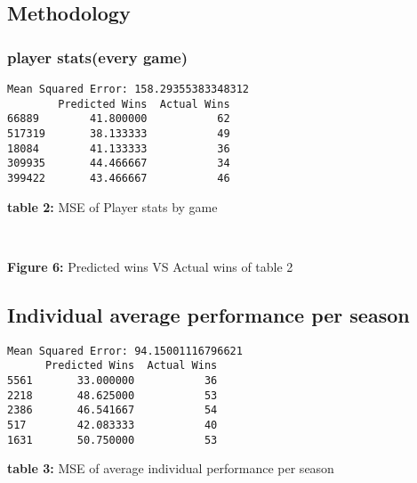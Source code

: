 \documentclass[11pt]{article}
\begin{document}
\subsection{Methodology}

\medskip
\medskip



    \subsubsection{player stats(every game)}
\begin{center}
     \begin{Verbatim}[commandchars=\\\{\}]
Mean Squared Error: 158.29355383348312
        Predicted Wins  Actual Wins
66889        41.800000           62
517319       38.133333           49
18084        41.133333           36
309935       44.466667           34
399422       43.466667           46
    \end{Verbatim}
\end{center}
\begin{center}
        \textbf{table 2:} MSE of Player stats by game
    \end{center}



    \begin{center}
    \end{center}
    { \hspace*{\fill} \\}
\begin{center}
        \textbf{Figure 6:} Predicted wins VS Actual wins of table 2
    \end{center}

    \subsection{Individual average performance per season}
   

\begin{center}
    

    \begin{Verbatim}[commandchars=\\\{\}]
Mean Squared Error: 94.15001116796621
      Predicted Wins  Actual Wins
5561       33.000000           36
2218       48.625000           53
2386       46.541667           54
517        42.083333           40
1631       50.750000           53
    \end{Verbatim}
\end{center}
    \begin{center}
        \textbf{table 3:} MSE of average individual performance per season
    \end{center}
\end{document}
